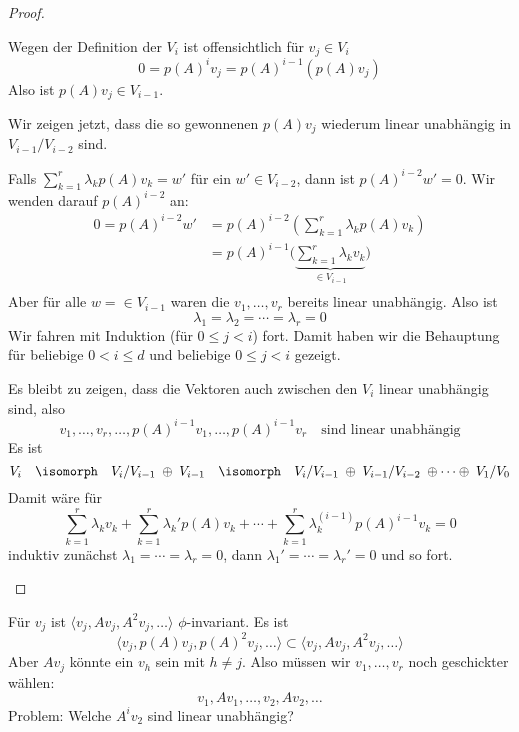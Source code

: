 \documentclass[a4paper, 10pt]{scrbook}
\begin{document}
\begin{lem}
\begin{proof}
\begin{enumerate}[(a)]
				Wegen der Definition der $V_i$ ist offensichtlich für $v_j\in V_i$
				\[
					0 = p(A)^i v_j = p(A)^{i-1}(p(A)v_j)
				\]
				Also ist $p(A)v_j \in V_{i-1}$.

				Wir zeigen jetzt, dass die so gewonnenen $p(A)v_j$ wiederum linear unabhängig in $V_{i-1}/V_{i-2}$ sind.

				Falls $\sum_{k=1}^r\lambda_kp(A)v_k = w'$ für ein $w'\in V_{i-2}$, dann ist $p(A)^{i-2}w' = 0$.
				Wir wenden darauf $p(A)^{i-2}$ an:
				\begin{align*}
					0= p(A)^{i-2}w' &=p(A)^{i-2}\left(\sum_{k=1}^r\lambda_k p(A)v_k\right) \\
															   &= p(A)^{i-1}\bigg(\underbrace{\sum_{k=1}^r\lambda_kv_k}_{\in V_{i-1}}\bigg)\\
				\end{align*}
				Aber für alle $w= \in V_{i-1}$ waren die $v_1,\dotsc,v_r$ bereits linear unabhängig.
				Also ist
				\[
					\lambda_1 = \lambda_2 = \dotsb = \lambda_r = 0
				\]
				Wir fahren mit Induktion (für $0\le j<i$) fort.
				Damit haben wir die Behauptung für beliebige $0<i\le d$ und beliebige $0\le j<i$ gezeigt.

				Es bleibt zu zeigen, dass die Vektoren auch zwischen den $V_i$ linear unabhängig sind, also
				\[
					v_1, \dotsc, v_r, \dotsc, p(A)^{i-1}v_1, \dotsc, p(A)^{i-1}v_r \quad \text{sind linear unabhängig}
				\]
				Es ist
				\[
					V_i \quad\isomorph\quad V_i/ V_{i-1} \;\oplus\; V_{i-1} \quad\isomorph\quad V_i/V_{i-1} \;\oplus\; V_{i-1}/V_{i-2} \;\oplus \dotsb \oplus\; V_1 / V_0
				\]
				Damit wäre für
				\[
					\sum_{k=1}^r \lambda_kv_k + \sum_{k=1}^r \lambda_k'p(A)v_k + \dotsb + \sum_{k=1}^r \lambda_k^{(i-1)}p(A)^{i-1}v_k = 0
				\]
				induktiv zunächst $\lambda_1=\dotsb=\lambda_r = 0$, dann $\lambda_1'=\dotsb=\lambda_r'=0$ und so fort.
		\end{enumerate}
	\end{proof}
\end{lem}
		

Für $v_j$ ist $\langle v_j, Av_j, A^2v_j, \dotsc\rangle$  $\phi$-invariant.
Es ist
\[
	\langle v_j, p(A)v_j, p(A)^2v_j, \dotsc \rangle \subset \langle v_j, Av_j, A^2v_j, \dotsc\rangle
\]
Aber $Av_j$ könnte ein $v_h$ sein mit $h\neq j$.
Also müssen wir $v_1, \dotsc, v_r$ noch geschickter wählen:
\[
	v_1, Av_1, \dotsc, v_2, Av_2, \dotsc
\]
Problem: Welche $A^iv_2$ sind linear unabhängig?
\end{document}
